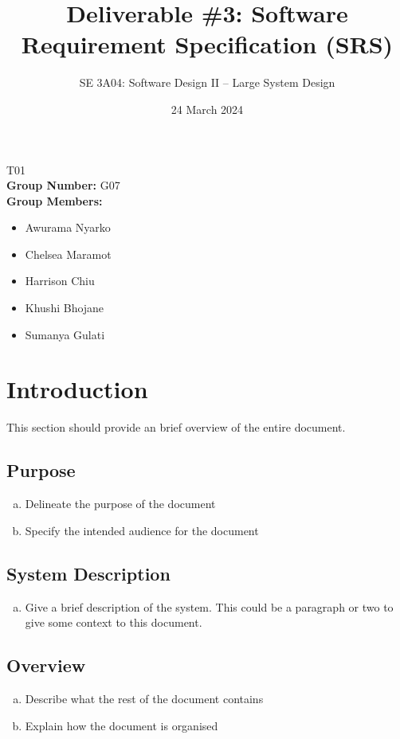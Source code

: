 \documentclass[]{article}
\title{Deliverable \#3: Software Requirement Specification (SRS)}
\author{SE 3A04: Software Design II -- Large System Design}
\date{24 March 2024}
\begin{document}
\maketitle
{} T01\\
{\bf Group Number:} G07 \\
{\bf Group Members:}
\begin{itemize}
	\item Awurama Nyarko
	\item Chelsea Maramot
	\item Harrison Chiu
	\item Khushi Bhojane
	\item Sumanya Gulati
\end{itemize}

\section{Introduction}
\label{sec:introduction}

This section should provide an brief overview of the entire document.

\subsection{Purpose}
\label{sub:purpose}
\begin{enumerate}[a)]
	\item Delineate the purpose of the document
	\item Specify the intended audience for the document
\end{enumerate}

\subsection{System Description}
\label{sub:system_description}
\begin{enumerate}[a)]
	\item Give a brief description of the system. This could be a paragraph or two to give some context to this document.
\end{enumerate}

\subsection{Overview}
\label{sub:overview}
\begin{enumerate}[a)]
	\item Describe what the rest of the document contains
	\item Explain how the document is organised
\end{enumerate}
\end{document}
